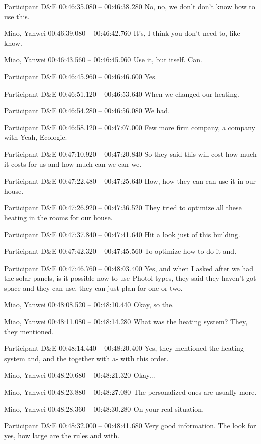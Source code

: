 {Participant D\&E 00:46:35.080 -- 00:46:38.280
No, no, we don't don't know how to use this.

Miao, Yanwei 00:46:39.080 -- 00:46:42.760
It's, I think you don't need to, like know.

Miao, Yanwei 00:46:43.560 -- 00:46:45.960
Use it, but itself. Can.

Participant D\&E 00:46:45.960 -- 00:46:46.600
Yes.

Participant D\&E 00:46:51.120 -- 00:46:53.640
When we changed our heating.

Participant D\&E 00:46:54.280 -- 00:46:56.080
We had.

Participant D\&E 00:46:58.120 -- 00:47:07.000
Few more firm company, a company with Yeah, Ecologic.

Participant D\&E 00:47:10.920 -- 00:47:20.840
So they said this will cost how much it costs for us and how much can we can we.

Participant D\&E 00:47:22.480 -- 00:47:25.640
How, how they can can use it in our house.

Participant D\&E 00:47:26.920 -- 00:47:36.520
They tried to optimize all these heating in the rooms for our house.

Participant D\&E 00:47:37.840 -- 00:47:41.640
Hit a look just of this building.

Participant D\&E 00:47:42.320 -- 00:47:45.560
To optimize how to do it and.

Participant D\&E 00:47:46.760 -- 00:48:03.400
Yes, and when I asked after we had the solar panels, is it possible now to use Photol types, they said they haven't got space and they can use, they can just plan for one or two.

Miao, Yanwei 00:48:08.520 -- 00:48:10.440
Okay, so the.

Miao, Yanwei 00:48:11.080 -- 00:48:14.280
What was the heating system? They, they mentioned.

Participant D\&E 00:48:14.440 -- 00:48:20.400
Yes, they mentioned the heating system and, and the together with a- with this order.

Miao, Yanwei 00:48:20.680 -- 00:48:21.320
Okay...

Miao, Yanwei 00:48:23.880 -- 00:48:27.080
The personalized ones are usually more.

Miao, Yanwei 00:48:28.360 -- 00:48:30.280
On your real situation.

Participant D\&E 00:48:32.000 -- 00:48:41.680
Very good information. The look for yes, how large are the rules and with.

}
